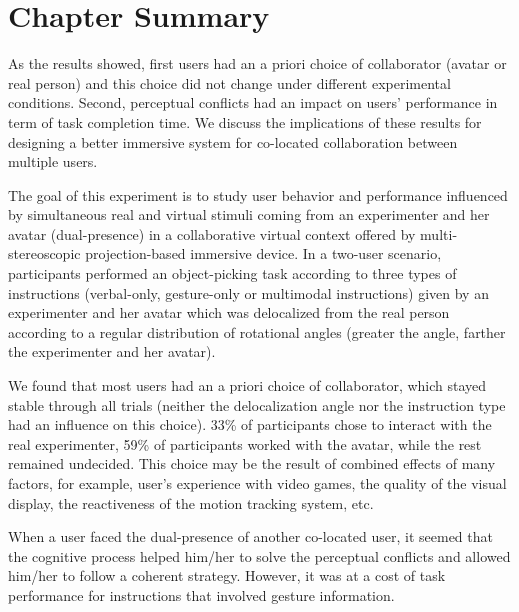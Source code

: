 \section{Chapter Summary}
As the results showed, first users had an a priori choice of collaborator (avatar or real person) and this choice did not change under different experimental conditions. Second, perceptual conflicts had an impact on users' performance in term of task completion time. We discuss the implications of these results for designing a better immersive system for co-located collaboration between multiple users.

The goal of this experiment is to study user behavior and performance influenced by simultaneous real and virtual stimuli coming from an experimenter and her avatar (dual-presence) in a collaborative virtual context offered by multi-stereoscopic projection-based immersive device. In a two-user scenario, participants performed an object-picking task according to three types of instructions (verbal-only, gesture-only or multimodal instructions) given by an experimenter and her avatar which was delocalized from the real person according to a regular distribution of rotational angles (greater the angle, farther the experimenter and her avatar).

We found that most users had an a priori choice of collaborator, which stayed stable through all trials (neither the delocalization angle nor the instruction type had an influence on this choice). 33\% of participants chose to interact with the real experimenter, 59\% of participants worked with the avatar, while the rest remained undecided. This choice may be the result of combined effects of many factors, for example, user's experience with video games, the quality of the visual display, the reactiveness of the motion tracking system, etc.

When a user faced the dual-presence of another co-located user, it seemed that the cognitive process helped him/her to solve the perceptual conflicts and allowed him/her to follow a coherent strategy. However, it was at a cost of task performance for instructions that involved gesture information.


